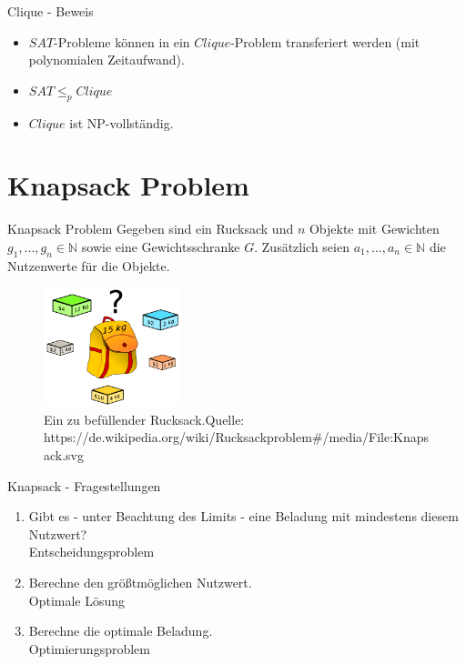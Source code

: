 \documentclass[12pt,handout,notes=dontshow,xcolor=table]{beamer}
\begin{document}
\begin{frame}{Clique - Beweis}
\begin{itemize}
\item \(SAT\)-Probleme können in ein \(Clique\)-Problem transferiert werden (mit polynomialen Zeitaufwand).\\
\item \(SAT \leq_p Clique\)\\
\item \(Clique\) ist NP-vollständig.
\end{itemize}
\end{frame}

\section{Knapsack Problem}
\begin{frame}{Knapsack Problem}
Gegeben sind ein Rucksack und \(n\) Objekte mit Gewichten \(g_1,...,g_n \in \mathbb{N}\) sowie eine Gewichtsschranke \(G\).
Zusätzlich seien \(a_1,...,a_n \in \mathbb{N}\) die Nutzenwerte für die Objekte. \cite{wegener}
\pause
\begin{figure}
\includegraphics[width=4cm]{figures/knapsack.png}
\caption{Ein zu befüllender Rucksack.\newline \newline \tiny Quelle: https://de.wikipedia.org/wiki/Rucksackproblem\#/media/File:Knapsack.svg}
\end{figure}
\end{frame}

\begin{frame}{Knapsack - Fragestellungen}
\begin{enumerate}
\item Gibt es - unter Beachtung des Limits - eine Beladung mit mindestens diesem Nutzwert?\\
\textrightarrow Entscheidungsproblem
\newline \pause
\item Berechne den größtmöglichen Nutzwert.\\
\textrightarrow Optimale Lösung
\newline \pause
\item Berechne die optimale Beladung.\\
\textrightarrow Optimierungsproblem
\end{enumerate}
\end{frame}
\end{document}
